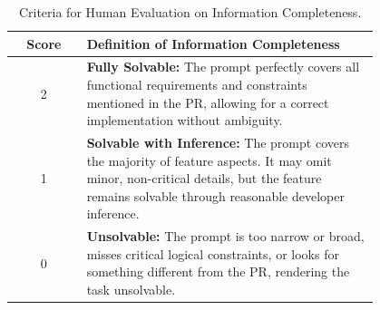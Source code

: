 \begin{table}[t]
  \caption{Criteria for Human Evaluation on Information Completeness.}
  \label{tab:human_eval_criteria}
  \begin{tabular}{c p{0.8\linewidth}}
    \toprule
    \textbf{Score} & \textbf{Definition of Information Completeness} \\
    \midrule
    2 & \textbf{Fully Solvable:} The prompt perfectly covers all functional requirements and constraints mentioned in the PR, allowing for a correct implementation without ambiguity. \\
    \midrule
    1 & \textbf{Solvable with Inference:} The prompt covers the majority of feature aspects. It may omit minor, non-critical details, but the feature remains solvable through reasonable developer inference. \\
    \midrule
    0 & \textbf{Unsolvable:} The prompt is too narrow or broad, misses critical logical constraints, or looks for something different from the PR, rendering the task unsolvable. \\
    \bottomrule
  \end{tabular}
\end{table}